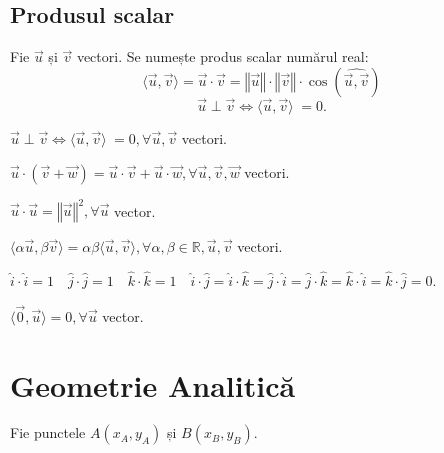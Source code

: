 \documentclass[11pt,a4paper]{article}
\begin{document}
\subsection{Produsul scalar}
Fie $\overrightarrow{u}$ și $\overrightarrow{v}$ vectori. Se numește produs scalar numărul real: \[\langle\overrightarrow{u},\overrightarrow{v}\rangle = \overrightarrow{u} \cdot \overrightarrow{v} = \left \Vert \overrightarrow{u} \right \Vert \cdot \left \Vert \overrightarrow{v} \right \Vert \cdot \cos(\widehat{\overrightarrow{u},\overrightarrow{v}}) \]
$$\overrightarrow{u} \perp \overrightarrow{v} \Leftrightarrow \langle\overrightarrow{u},\overrightarrow{v}\rangle  \hspace{3pt} =   0. $$
\begin{Properties}
\item $\overrightarrow{u} \perp \overrightarrow{v} \Leftrightarrow \langle\overrightarrow{u},\overrightarrow{v}\rangle  \hspace{3pt} =   0, \forall \overrightarrow{u},\overrightarrow{v}$ vectori.
\item $\overrightarrow{u}\cdot(\overrightarrow{v}+\overrightarrow{w}) = \overrightarrow{u} \cdot \overrightarrow{v} + \overrightarrow{u} \cdot \overrightarrow{w}, \forall \overrightarrow{u}, \overrightarrow{v}, \overrightarrow{w} $ vectori.
\item $\overrightarrow{u} \cdot \overrightarrow{u} = \left \Vert \overrightarrow{u} \right \Vert ^2, \forall \overrightarrow{u}$ vector.
\item $\langle\alpha \overrightarrow{u}, \beta\overrightarrow{v}\rangle = \alpha\beta \langle\overrightarrow{u}, \overrightarrow{v}\rangle, \forall \alpha,\beta \in \mathbb{R}, \overrightarrow{u}, \overrightarrow{v}$ vectori.
\item $\hat{i} \cdot \hat{i} = 1 \quad \hat{j} \cdot \hat{j} = 1 \quad \hat{k} \cdot \hat{k} = 1 \quad \hat{i} \cdot \hat{j} = \hat{i}\cdot\hat{k}=\hat{j}\cdot\hat{i}=\hat{j}\cdot\hat{k}=\hat{k}\cdot\hat{i}=\hat{k}\cdot\hat{j}=0$.
\item $\langle\overrightarrow{0}, \overrightarrow{u}\rangle = 0, \forall \overrightarrow{u}$ vector.
\end{Properties}
\section{Geometrie Analitică}
Fie punctele $A(x_A, y_A)$ și $B(x_B, y_B)$.
\end{document}
